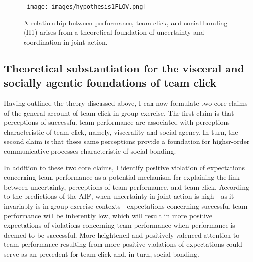 \begin{CJK}{UTF8}{gbsn}
\begin{figure}[htbp]
  \texttt{[image: images/hypothesis1FLOW.png]}
  \caption{A relationship between performance, team click, and social bonding (H1) arises from a theoretical foundation of uncertainty and coordination in joint action.}
  \label{fig:hypothesis1FLOW}
\end{figure}









\subsection{Theoretical substantiation for the visceral and socially agentic foundations of team click \label{sect:visceralAgency}}

Having outlined the theory discussed above, I can now formulate two core claims of the general account of team click in group exercise.  The first claim is that perceptions of successful team performance are associated with perceptions characteristic of team click, namely, viscerality and social agency.  In turn, the second claim is that these same perceptions provide a foundation for higher-order communicative processes characteristic of social bonding.

In addition to these two core claims, I identify positive violation of expectations concerning team performance as a potential mechanism for explaining the link between uncertainty, perceptions of team performance, and team click.  According to the predictions of the AIF, when uncertainty in joint action is high---as it invariably is in group exercise contexts---expectations concerning successful team performance will be inherently low, which will result in more positive expectations of violations concerning team performance when performance is deemed to be successful.  More heightened and positively-valenced attention to team performance resulting from more positive violations of expectations could serve as an precedent for team click and, in turn, social bonding.



\end{CJK}
